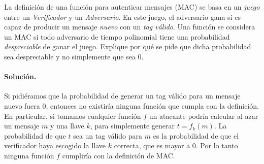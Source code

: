 La definición de una función para autenticar mensajes (MAC) se basa en un \emph{juego} entre un \emph{Verificador} y un \emph{Adversario}. En este juego, el adversario gana si es capaz de producir un mensaje \emph{nuevo} con un \emph{tag válido}. Una función se considera un MAC si todo adversario de tiempo polinomial tiene una probabilidad \emph{despreciable} de ganar el juego. Explique por qué se pide que dicha probabilidad sea despreciable y no simplemente que sea 0.

\paragraph{Solución.} Si pidiéramos que la probabilidad de generar un tag válido para un mensaje nuevo fuera 0, entonces no existiría ninguna función que cumpla con la definición. En particular, si tomamos cualquier función $f$ un atacante podría calcular al azar un mensaje $m$ y una llave $k$, para simplemente generar $t=f_k(m)$. La probabilidad de que $t$ sea un tag válido para $m$ es la probabilidad de que el verificador haya escogido la llave $k$ correcta, que es mayor a 0. Por lo tanto ninguna función $f$ cumpliría con la definición de MAC.
